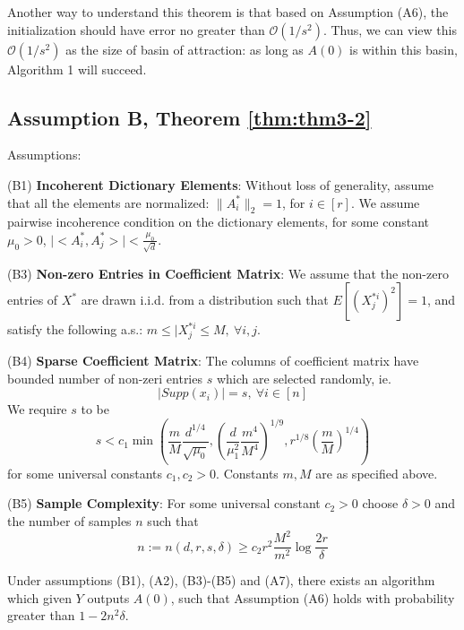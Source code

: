 Another way to understand this theorem is that based on Assumption (A6), the initialization should have error no greater than $\mathcal{O}(1/s^2)$. Thus, we can view this $\mathcal{O}(1/s^2)$ as the size of basin of attraction: as long as $A(0)$ is within this basin, Algorithm 1 will succeed.

\subsection{Assumption B, Theorem \ref{thm:thm3-2}}
Assumptions:

(B1) \textbf{Incoherent Dictionary Elements}: Without loss of generality, assume that all the elements are normalized: $\lVert A_i^*\rVert_2=1$, for $i\in [r]$. We assume pairwise incoherence condition on the dictionary elements, for some constant $\mu_0>0$, $\lvert <A_i^*,A_j^*>\rvert < \frac{\mu_0}{\sqrt{d}}$.

(B3) \textbf{Non-zero Entries in Coefficient Matrix}: We assume that the non-zero entries of $X^*$ are drawn i.i.d. from a distribution such that $E[(X^{*i}_j)^2]=1$, and satisfy the following a.s.: $m\leq \lvert X^{*i}_j\leq M,~\forall i,j$.

(B4) \textbf{Sparse Coefficient Matrix}: The columns of coefficient matrix have bounded number of non-zeri entries $s$ which are selected randomly, ie.
\begin{equation*}
\lvert Supp(x_i)\rvert =s,~\forall i\in [n]
\end{equation*}
We require $s$ to be
\begin{equation*}
s<c_1\min(\frac{m}{M}\frac{d^{1/4}}{\sqrt{\mu_0}},(\frac{d}{\mu_1^2}\frac{m^4}{M^4})^{1/9},r^{1/8}(\frac{m}{M})^{1/4})
\end{equation*}
for some universal constants $c_1,c_2>0$. Constants $m,M$ are as specified above.

(B5) \textbf{Sample Complexity}: For some universal constant $c_2>0$ choose $\delta >0$ and the number of samples $n$ such that
\begin{equation*}
n:=n(d,r,s,\delta)\geq c_2r^2\frac{M^2}{m^2}\log\frac{2r}{\delta}
\end{equation*}

\begin{theorem}
Under assumptions (B1), (A2), (B3)-(B5) and (A7), there exists an algorithm which given $Y$ outputs $A(0)$, such that Assumption (A6) holds with probability greater than $1-2n^2\delta$.
\label{thm:thm3-2}
\end{theorem}

